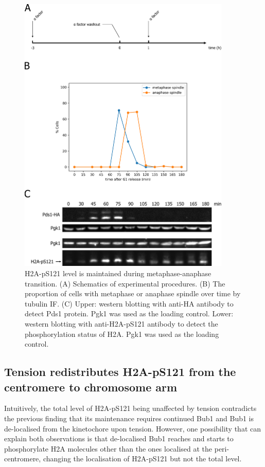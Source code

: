 \begin{figure}[htbp]
  \centering
  \includegraphics[width=0.9\textwidth]{chapter3/figures/pH2A mitotic time course.pdf}
  \caption[H2A-pS121 level is maintained during metaphase-anaphase transition]{H2A-pS121 level is maintained during metaphase-anaphase transition. (A) Schematics of experimental procedures. (B) The proportion of cells with metaphase or anaphase spindle over time by tubulin IF. (C) Upper: western blotting with anti-HA antibody to detect Pds1 protein. Pgk1 was used as the loading control. Lower: western blotting with anti-H2A-pS121 antibody to detect the phosphorylation status of H2A. Pgk1 was used as the loading control.}
  \label{fig:ph2atimecourse}
\end{figure}

\subsection{Tension redistributes H2A-pS121 from the centromere to chromosome arm}
Intuitively, the total level of H2A-pS121 being unaffected by tension contradicts the previous finding that its maintenance requires continued Bub1 and Bub1 is de-localised from the kinetochore upon tension. However, one possibility that can explain both observations is that de-localised Bub1 reaches and starts to phosphorylate H2A molecules other than the ones localised at the peri-centromere, changing the localisation of H2A-pS121 but not the total level. 

